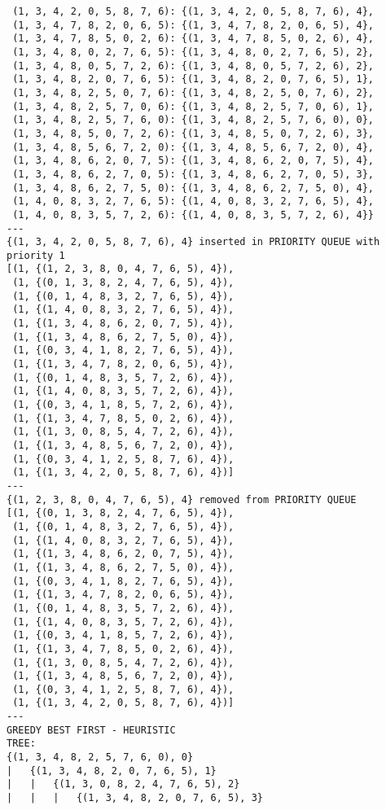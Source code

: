 \documentclass{article}
\begin{document}
\begin{verbatim}
 (1, 3, 4, 2, 0, 5, 8, 7, 6): {(1, 3, 4, 2, 0, 5, 8, 7, 6), 4},
 (1, 3, 4, 7, 8, 2, 0, 6, 5): {(1, 3, 4, 7, 8, 2, 0, 6, 5), 4},
 (1, 3, 4, 7, 8, 5, 0, 2, 6): {(1, 3, 4, 7, 8, 5, 0, 2, 6), 4},
 (1, 3, 4, 8, 0, 2, 7, 6, 5): {(1, 3, 4, 8, 0, 2, 7, 6, 5), 2},
 (1, 3, 4, 8, 0, 5, 7, 2, 6): {(1, 3, 4, 8, 0, 5, 7, 2, 6), 2},
 (1, 3, 4, 8, 2, 0, 7, 6, 5): {(1, 3, 4, 8, 2, 0, 7, 6, 5), 1},
 (1, 3, 4, 8, 2, 5, 0, 7, 6): {(1, 3, 4, 8, 2, 5, 0, 7, 6), 2},
 (1, 3, 4, 8, 2, 5, 7, 0, 6): {(1, 3, 4, 8, 2, 5, 7, 0, 6), 1},
 (1, 3, 4, 8, 2, 5, 7, 6, 0): {(1, 3, 4, 8, 2, 5, 7, 6, 0), 0},
 (1, 3, 4, 8, 5, 0, 7, 2, 6): {(1, 3, 4, 8, 5, 0, 7, 2, 6), 3},
 (1, 3, 4, 8, 5, 6, 7, 2, 0): {(1, 3, 4, 8, 5, 6, 7, 2, 0), 4},
 (1, 3, 4, 8, 6, 2, 0, 7, 5): {(1, 3, 4, 8, 6, 2, 0, 7, 5), 4},
 (1, 3, 4, 8, 6, 2, 7, 0, 5): {(1, 3, 4, 8, 6, 2, 7, 0, 5), 3},
 (1, 3, 4, 8, 6, 2, 7, 5, 0): {(1, 3, 4, 8, 6, 2, 7, 5, 0), 4},
 (1, 4, 0, 8, 3, 2, 7, 6, 5): {(1, 4, 0, 8, 3, 2, 7, 6, 5), 4},
 (1, 4, 0, 8, 3, 5, 7, 2, 6): {(1, 4, 0, 8, 3, 5, 7, 2, 6), 4}}
---
{(1, 3, 4, 2, 0, 5, 8, 7, 6), 4} inserted in PRIORITY QUEUE with priority 1
[(1, {(1, 2, 3, 8, 0, 4, 7, 6, 5), 4}),
 (1, {(0, 1, 3, 8, 2, 4, 7, 6, 5), 4}),
 (1, {(0, 1, 4, 8, 3, 2, 7, 6, 5), 4}),
 (1, {(1, 4, 0, 8, 3, 2, 7, 6, 5), 4}),
 (1, {(1, 3, 4, 8, 6, 2, 0, 7, 5), 4}),
 (1, {(1, 3, 4, 8, 6, 2, 7, 5, 0), 4}),
 (1, {(0, 3, 4, 1, 8, 2, 7, 6, 5), 4}),
 (1, {(1, 3, 4, 7, 8, 2, 0, 6, 5), 4}),
 (1, {(0, 1, 4, 8, 3, 5, 7, 2, 6), 4}),
 (1, {(1, 4, 0, 8, 3, 5, 7, 2, 6), 4}),
 (1, {(0, 3, 4, 1, 8, 5, 7, 2, 6), 4}),
 (1, {(1, 3, 4, 7, 8, 5, 0, 2, 6), 4}),
 (1, {(1, 3, 0, 8, 5, 4, 7, 2, 6), 4}),
 (1, {(1, 3, 4, 8, 5, 6, 7, 2, 0), 4}),
 (1, {(0, 3, 4, 1, 2, 5, 8, 7, 6), 4}),
 (1, {(1, 3, 4, 2, 0, 5, 8, 7, 6), 4})]
---
{(1, 2, 3, 8, 0, 4, 7, 6, 5), 4} removed from PRIORITY QUEUE
[(1, {(0, 1, 3, 8, 2, 4, 7, 6, 5), 4}),
 (1, {(0, 1, 4, 8, 3, 2, 7, 6, 5), 4}),
 (1, {(1, 4, 0, 8, 3, 2, 7, 6, 5), 4}),
 (1, {(1, 3, 4, 8, 6, 2, 0, 7, 5), 4}),
 (1, {(1, 3, 4, 8, 6, 2, 7, 5, 0), 4}),
 (1, {(0, 3, 4, 1, 8, 2, 7, 6, 5), 4}),
 (1, {(1, 3, 4, 7, 8, 2, 0, 6, 5), 4}),
 (1, {(0, 1, 4, 8, 3, 5, 7, 2, 6), 4}),
 (1, {(1, 4, 0, 8, 3, 5, 7, 2, 6), 4}),
 (1, {(0, 3, 4, 1, 8, 5, 7, 2, 6), 4}),
 (1, {(1, 3, 4, 7, 8, 5, 0, 2, 6), 4}),
 (1, {(1, 3, 0, 8, 5, 4, 7, 2, 6), 4}),
 (1, {(1, 3, 4, 8, 5, 6, 7, 2, 0), 4}),
 (1, {(0, 3, 4, 1, 2, 5, 8, 7, 6), 4}),
 (1, {(1, 3, 4, 2, 0, 5, 8, 7, 6), 4})]
---
GREEDY BEST FIRST - HEURISTIC
TREE:
{(1, 3, 4, 8, 2, 5, 7, 6, 0), 0}
|   {(1, 3, 4, 8, 2, 0, 7, 6, 5), 1}
|   |   {(1, 3, 0, 8, 2, 4, 7, 6, 5), 2}
|   |   |   {(1, 3, 4, 8, 2, 0, 7, 6, 5), 3}

\end{verbatim}
\end{document}
